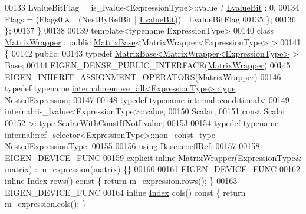 \begin{DoxyCode}
00133     LvalueBitFlag = is\_lvalue<ExpressionType>::value ? \hyperlink{group__flags_gae2c323957f20dfdc6cb8f44428eaec1a}{LvalueBit} : 0,
00134     Flags = (Flags0 & ~(NestByRefBit | \hyperlink{group__flags_gae2c323957f20dfdc6cb8f44428eaec1a}{LvalueBit})) | LvalueBitFlag
00135   \};
00136 \};
00137 \}
00138 
00139 \textcolor{keyword}{template}<\textcolor{keyword}{typename} ExpressionType>
00140 \textcolor{keyword}{class }\hyperlink{group___core___module_class_eigen_1_1_matrix_wrapper}{MatrixWrapper} : \textcolor{keyword}{public} \hyperlink{group___core___module_class_eigen_1_1_matrix_base}{MatrixBase}<MatrixWrapper<ExpressionType> >
00141 \{
00142   \textcolor{keyword}{public}:
00143     \textcolor{keyword}{typedef} \hyperlink{group___core___module_class_eigen_1_1_matrix_base}{MatrixBase<MatrixWrapper<ExpressionType>} > Base;
00144     EIGEN\_DENSE\_PUBLIC\_INTERFACE(\hyperlink{group___core___module_class_eigen_1_1_matrix_wrapper}{MatrixWrapper})
00145     EIGEN\_INHERIT\_ASSIGNMENT\_OPERATORS(\hyperlink{group___core___module_class_eigen_1_1_matrix_wrapper}{MatrixWrapper})
00146     \textcolor{keyword}{typedef} \textcolor{keyword}{typename} \hyperlink{group___sparse_core___module}{internal::remove\_all<ExpressionType>::type} 
      NestedExpression;
00147 
00148     \textcolor{keyword}{typedef} \textcolor{keyword}{typename} \hyperlink{struct_eigen_1_1internal_1_1conditional}{internal::conditional}<
00149                        internal::is\_lvalue<ExpressionType>::value,
00150                        Scalar,
00151                        \textcolor{keyword}{const} Scalar
00152                      >::type ScalarWithConstIfNotLvalue;
00153 
00154     \textcolor{keyword}{typedef} \textcolor{keyword}{typename} \hyperlink{class_eigen_1_1internal_1_1_tensor_lazy_evaluator_writable}{internal::ref\_selector<ExpressionType>::non\_const\_type}
       NestedExpressionType;
00155 
00156     \textcolor{keyword}{using} Base::coeffRef;
00157 
00158     EIGEN\_DEVICE\_FUNC
00159     \textcolor{keyword}{explicit} \textcolor{keyword}{inline} \hyperlink{group___core___module_class_eigen_1_1_matrix_wrapper}{MatrixWrapper}(ExpressionType& matrix) : m\_expression(matrix) \{\}
00160 
00161     EIGEN\_DEVICE\_FUNC
00162     \textcolor{keyword}{inline} \hyperlink{namespace_eigen_a62e77e0933482dafde8fe197d9a2cfde}{Index} rows()\textcolor{keyword}{ const }\{ \textcolor{keywordflow}{return} m\_expression.rows(); \}
00163     EIGEN\_DEVICE\_FUNC
00164     \textcolor{keyword}{inline} \hyperlink{namespace_eigen_a62e77e0933482dafde8fe197d9a2cfde}{Index} cols()\textcolor{keyword}{ const }\{ \textcolor{keywordflow}{return} m\_expression.cols(); \}

\end{DoxyCode}
